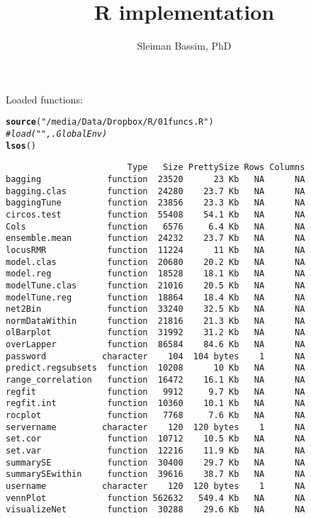 \documentclass[9pt,english]{extarticle}\usepackage[]{graphicx}\usepackage[]{color}
\makeatletter
\newcommand{\hlstr}[1]{\textcolor[rgb]{0.192,0.494,0.8}{#1}}%
\newcommand{\hlcom}[1]{\textcolor[rgb]{0.678,0.584,0.686}{\textit{#1}}}%
\newcommand{\hlstd}[1]{\textcolor[rgb]{0.345,0.345,0.345}{#1}}%
\newcommand{\hlkwd}[1]{\textcolor[rgb]{0.737,0.353,0.396}{\textbf{#1}}}%
\newenvironment{kframe}{%
 \def\at@end@of@kframe{}%
 \ifinner\ifhmode%
  \def\at@end@of@kframe{\end{minipage}}%
  \begin{minipage}{\columnwidth}%
 \fi\fi%
 \def\FrameCommand##1{\hskip\@totalleftmargin \hskip-\fboxsep
 \colorbox{shadecolor}{##1}\hskip-\fboxsep
     \hskip-\linewidth \hskip-\@totalleftmargin \hskip\columnwidth}%
 \MakeFramed {\advance\hsize-\width
   \@totalleftmargin\z@ \linewidth\hsize
   \@setminipage}}%
 {\par\unskip\endMakeFramed%
 \at@end@of@kframe}
\newenvironment{knitrout}{}{} %
\makeatother
\begin{document}
\author{Sleiman Bassim, PhD}
\title{R implementation}
\maketitle
\begin{linenumbers}


\noindent
Loaded functions:
\begin{knitrout}
\color{fgcolor}\begin{kframe}
\begin{alltt}
\hlkwd{source}\hlstd{(}\hlstr{"/media/Data/Dropbox/R/01funcs.R"}\hlstd{)}
\hlcom{#load("", .GlobalEnv)}
\hlkwd{lsos}\hlstd{()}
\end{alltt}
\begin{verbatim}
                        Type   Size PrettySize Rows Columns
bagging             function  23520      23 Kb   NA      NA
bagging.clas        function  24280    23.7 Kb   NA      NA
baggingTune         function  23856    23.3 Kb   NA      NA
circos.test         function  55408    54.1 Kb   NA      NA
Cols                function   6576     6.4 Kb   NA      NA
ensemble.mean       function  24232    23.7 Kb   NA      NA
locusRMR            function  11224      11 Kb   NA      NA
model.clas          function  20680    20.2 Kb   NA      NA
model.reg           function  18528    18.1 Kb   NA      NA
modelTune.clas      function  21016    20.5 Kb   NA      NA
modelTune.reg       function  18864    18.4 Kb   NA      NA
net2Bin             function  33240    32.5 Kb   NA      NA
normDataWithin      function  21816    21.3 Kb   NA      NA
olBarplot           function  31992    31.2 Kb   NA      NA
overLapper          function  86584    84.6 Kb   NA      NA
password           character    104  104 bytes    1      NA
predict.regsubsets  function  10208      10 Kb   NA      NA
range_correlation   function  16472    16.1 Kb   NA      NA
regfit              function   9912     9.7 Kb   NA      NA
regfit.int          function  10360    10.1 Kb   NA      NA
rocplot             function   7768     7.6 Kb   NA      NA
servername         character    120  120 bytes    1      NA
set.cor             function  10712    10.5 Kb   NA      NA
set.var             function  12216    11.9 Kb   NA      NA
summarySE           function  30400    29.7 Kb   NA      NA
summarySEwithin     function  39616    38.7 Kb   NA      NA
username           character    120  120 bytes    1      NA
vennPlot            function 562632   549.4 Kb   NA      NA
visualizeNet        function  30288    29.6 Kb   NA      NA
\end{verbatim}
\end{kframe}
\end{knitrout}


\end{linenumbers}
\end{document}
